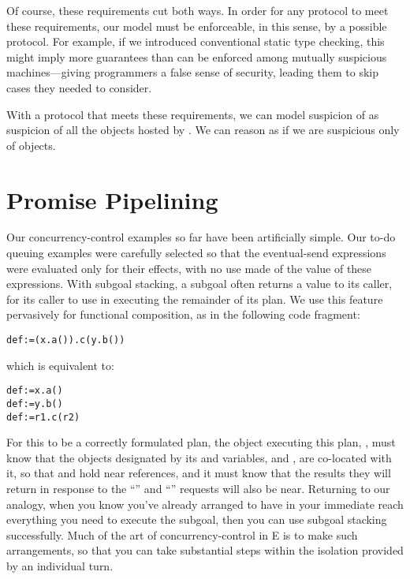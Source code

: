 \documentclass{llncs}
\begin{document}

 Of course, these requirements cut both ways. In order
for any protocol to meet these requirements, our model must be
enforceable, in this sense, by a possible protocol. For example, if we
introduced conventional static type checking, this might imply more
guarantees than can be enforced among mutually suspicious
machines---giving programmers a false sense of security, leading them
to skip cases they needed to consider. 

With a protocol that meets these requirements, we can model suspicion
of  as suspicion of all the objects hosted by . We can
reason as if we are suspicious only of objects. 

\section{Promise Pipelining}

Our concurrency-control examples so far have been artificially
simple. Our to-do queuing examples were carefully selected so that the
eventual-send expressions were evaluated only for their effects, with
no use made of the value of these expressions. With subgoal stacking,
a subgoal often returns a value to its caller, for its caller to use
in executing the remainder of its plan. We use this feature
pervasively for functional composition, as in the following code
fragment:
%
\begin{alltt}
    def  := (x.a()).c(y.b())
\end{alltt}
%
which is equivalent to:
%
\begin{alltt}
    def  := x.a() 
    def  := y.b() 
    def  := r1.c(r2)
\end{alltt}
%
For this to be a correctly formulated plan, the object executing this
plan, , must know that the objects designated by its 
and  variables,  and , are co-located with it,
so that  and  hold near references, and it must know
that the results they will return in response to the ``''
and ``'' requests will also be near. Returning to our
analogy,  when you know you've already arranged
to have in your immediate reach everything you need to execute the
subgoal, then you can use subgoal stacking successfully. Much of the
art of concurrency-control in E is to make such arrangements, so that
you can take substantial steps within the isolation provided by an
individual turn.
\end{document}
